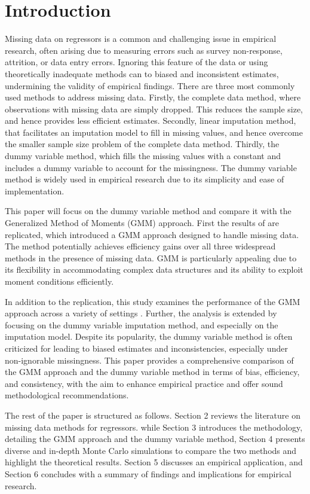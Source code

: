 \section{Introduction}
Missing data on regressors is a common and challenging issue in empirical research, often arising due to measuring errors such as survey non-response, attrition, or data entry errors.
Ignoring this feature of the data or using theoretically inadequate methods can  to biased and inconsistent estimates, undermining the validity of empirical findings.
There are three most commonly used methods to address missing data.
Firstly, the complete data method, where observations with missing data are simply dropped. This reduces the sample size, and hence provides less efficient estimates.
Secondly, linear imputation method, that facilitates an imputation model to fill in missing values, and hence overcome the smaller sample size problem of the complete data method.
Thirdly, the dummy variable method, which fills the missing values with a constant and includes a dummy variable to account for the missingness.
The dummy variable method is widely used in empirical research due to its simplicity and ease of implementation.


This paper will focus on the dummy variable method and compare it with the Generalized Method of Moments (GMM) approach. First the results of \cite{abrevaya2017} are replicated, which introduced a GMM approach designed to handle missing data. The method potentially achieves efficiency gains over all three widespread methods in the presence of missing data.
GMM is particularly appealing due to its flexibility in accommodating complex data structures and its ability to exploit moment conditions efficiently.

In addition to the replication, this study examines the performance of the GMM approach across a variety of settings
.
Further, the analysis is extended by focusing on the dummy variable imputation method, and especially on the imputation model.
Despite its popularity, the dummy variable method is often criticized for leading to biased estimates and inconsistencies, especially under non-ignorable missingness.
This paper provides a comprehensive comparison of the GMM approach and the dummy variable method in terms of bias, efficiency, and consistency, with the aim to enhance empirical practice and offer sound methodological recommendations.

The rest of the paper is structured as follows.
Section 2 reviews the literature on missing data methods for regressors.
while Section 3 introduces the methodology, detailing the GMM approach and the dummy variable method, Section 4 presents diverse and in-depth Monte Carlo simulations to compare the two methods and highlight the theoretical results.
Section 5 discusses an empirical application, and
Section 6 concludes with a summary of findings and implications for empirical research.
